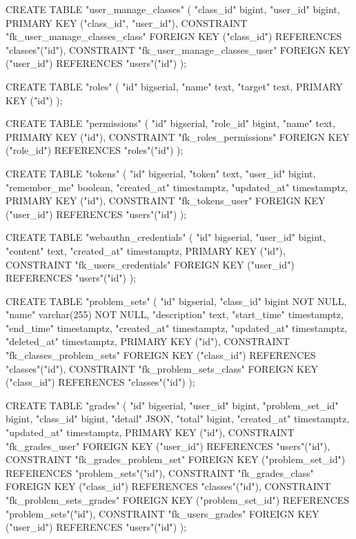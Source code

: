 \documentclass{ctexrep}
\begin{document}
\begin{run}
    CREATE TABLE "user_manage_classes" (
        "class_id" bigint,
        "user_id" bigint,
        PRIMARY KEY ("class_id", "user_id"),
        CONSTRAINT "fk_user_manage_classes_class" FOREIGN KEY ("class_id") REFERENCES "classes"("id"),
        CONSTRAINT "fk_user_manage_classes_user" FOREIGN KEY ("user_id") REFERENCES "users"("id")
    );
    
    CREATE TABLE "roles" (
        "id" bigserial,
        "name" text,
        "target" text,
        PRIMARY KEY ("id")
    );
    
    CREATE TABLE "permissions" (
        "id" bigserial,
        "role_id" bigint,
        "name" text,
        PRIMARY KEY ("id"),
        CONSTRAINT "fk_roles_permissions" FOREIGN KEY ("role_id") REFERENCES "roles"("id")
    );
    
    CREATE TABLE "tokens" (
        "id" bigserial,
        "token" text,
        "user_id" bigint,
        "remember_me" boolean,
        "created_at" timestamptz,
        "updated_at" timestamptz,
        PRIMARY KEY ("id"),
        CONSTRAINT "fk_tokens_user" FOREIGN KEY ("user_id") REFERENCES "users"("id")
    );
    
    CREATE TABLE "webauthn_credentials" (
        "id" bigserial,
        "user_id" bigint,
        "content" text,
        "created_at" timestamptz,
        PRIMARY KEY ("id"),
        CONSTRAINT "fk_users_credentials" FOREIGN KEY ("user_id") REFERENCES "users"("id")
    );
    
    CREATE TABLE "problem_sets" (
        "id" bigserial,
        "class_id" bigint NOT NULL,
        "name" varchar(255) NOT NULL,
        "description" text,
        "start_time" timestamptz,
        "end_time" timestamptz,
        "created_at" timestamptz,
        "updated_at" timestamptz,
        "deleted_at" timestamptz,
        PRIMARY KEY ("id"),
        CONSTRAINT "fk_classes_problem_sets" FOREIGN KEY ("class_id") REFERENCES "classes"("id"),
        CONSTRAINT "fk_problem_sets_class" FOREIGN KEY ("class_id") REFERENCES "classes"("id")
    );
    
    CREATE TABLE "grades" (
        "id" bigserial,
        "user_id" bigint,
        "problem_set_id" bigint,
        "class_id" bigint,
        "detail" JSON,
        "total" bigint,
        "created_at" timestamptz,
        "updated_at" timestamptz,
        PRIMARY KEY ("id"),
        CONSTRAINT "fk_grades_user" FOREIGN KEY ("user_id") REFERENCES "users"("id"),
        CONSTRAINT "fk_grades_problem_set" FOREIGN KEY ("problem_set_id") REFERENCES "problem_sets"("id"),
        CONSTRAINT "fk_grades_class" FOREIGN KEY ("class_id") REFERENCES "classes"("id"),
        CONSTRAINT "fk_problem_sets_grades" FOREIGN KEY ("problem_set_id") REFERENCES "problem_sets"("id"),
        CONSTRAINT "fk_users_grades" FOREIGN KEY ("user_id") REFERENCES "users"("id")
    );
    

\end{run}
\end{document}
